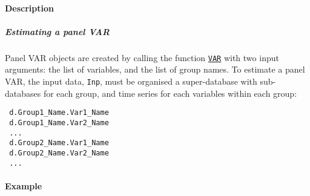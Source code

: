  \paragraph{Description}
 
 \subparagraph{Estimating a panel VAR}
 
 Panel VAR objects are created by calling the function
 \href{VAR/VAR}{\texttt{VAR}} with two input arguments: the list of
 variables, and the list of group names. To estimate a panel VAR, the
 input data, \texttt{Inp}, must be organised a super-database with
 sub-databases for each group, and time series for each variables within
 each group:
 
 \begin{verbatim}
 d.Group1_Name.Var1_Name
 d.Group1_Name.Var2_Name
 ...
 d.Group2_Name.Var1_Name
 d.Group2_Name.Var2_Name
 ...
 \end{verbatim}
 
 \paragraph{Example}


